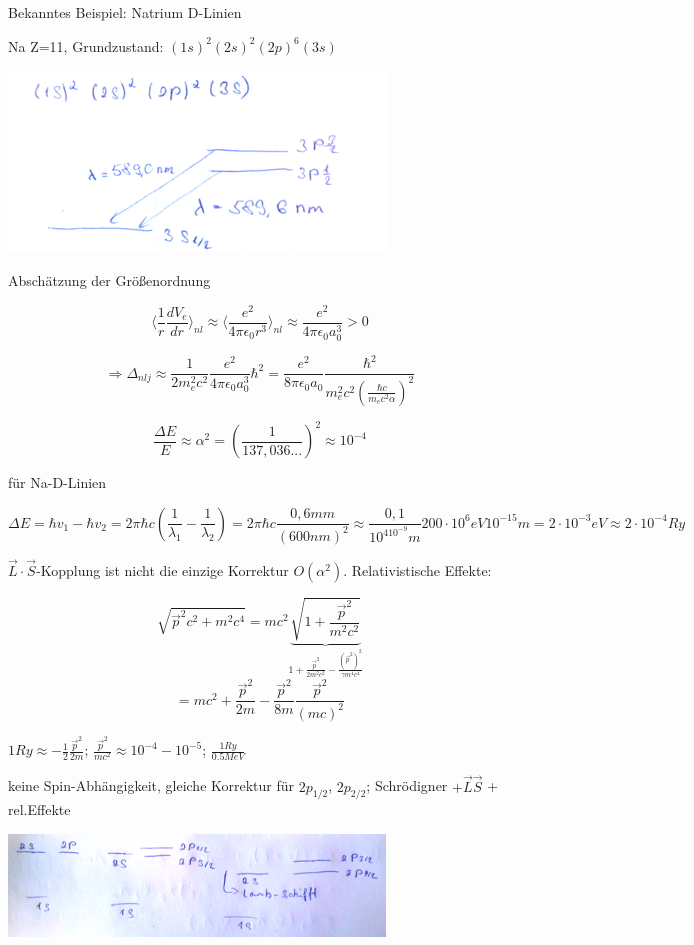 Bekanntes Beispiel: Natrium D-Linien

Na Z=11, Grundzustand: \((1s)^2(2s)^2(2p)^6(3s)\)

\includegraphics[width=0.75\textwidth]{kap03_02.png}

Abschätzung der Größenordnung

\[\langle \frac{1}{r}\frac{dV_e}{dr}\rangle_{nl} \approx \langle \frac{e^2}{4\pi \epsilon_0 r^3}\rangle_{nl}\approx  \frac{e^2}{4\pi \epsilon_0 a^3_0} > 0 \]

\[\Rightarrow \Delta_{nlj} \approx \frac{1}{2m^2_e c^2} \frac{e^2}{4\pi \epsilon_0 a^3_0}\hbar^2 = \frac{e^2}{8\pi \epsilon_0 a_0}\frac{\hbar^2}{m^2_e c^2(\frac{\hbar c}{m_e c^2 \alpha})^2} \]

\[ \frac{\Delta E}{E}\approx \alpha^2 = (\frac{1}{137,036...})^2 \approx 10^{-4}\]

für Na-D-Linien

\[\Delta E = \hbar v_1-\hbar v_2 = 2\pi \hbar c(\frac{1}{\lambda_1}-\frac{1}{\lambda_2}) = 2\pi \hbar c \frac{0,6mm}{(600nm)^2} \approx \frac{0,1}{10^410^{-9}m}200\cdot 10^6 eV 10^{-15}m = 2\cdot 10^{-3}eV\approx 2\cdot 10^{-4}Ry\]

\(\vec L \cdot \vec S\)-Kopplung ist nicht die einzige Korrektur \(O(\alpha^2)\). Relativistische Effekte:

\[ \sqrt{\vec p^2 c^2+m^2c^4}= mc^2\underbrace{\sqrt{1+\frac{\vec p^2}{m^2c^2}}}_{1+\frac{\vec p^2}{2m^2c^2}-\frac{(\vec p^2)^2}{\gamma m^4 c^4}}\]
\[ = mc^2 + \frac{\vec p^2}{2m}-\frac{\vec p^2}{8m}\frac{\vec p^2}{(mc)^2}\]

\(1 Ry \approx -\frac{1}{2} \frac{\vec p^2}{2m}\); \(\frac{\vec p^2}{mc^2}\approx 10^{-4}-10^{-5}\); \(\frac{1Ry}{0.5 MeV}\)


keine Spin-Abhängigkeit, gleiche Korrektur für \(2p_{1/2}\), \(2p_{2/2}\); Schrödigner \(+\vec L \vec S\) + rel.Effekte

\includegraphics[width=0.75\textwidth]{kap03_03.png}

